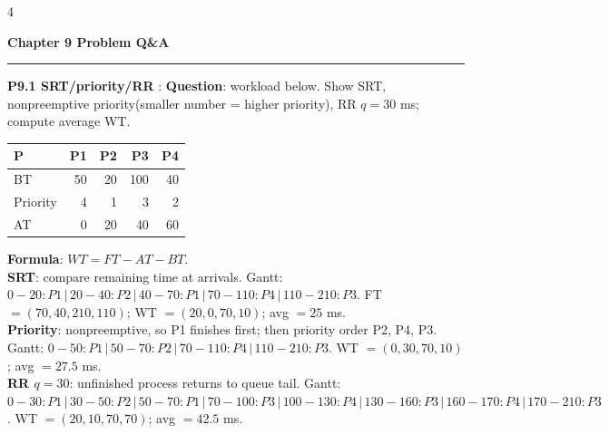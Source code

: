 \documentclass[UTF8,10pt,landscape]{ctexart}
\newcommand{\cheatsectionfont}{\fontsize{9.6pt}{10.1pt}\selectfont}
\newcommand{\cheattinyfont}{\fontsize{7.7pt}{8.2pt}\selectfont}
\newcommand{\cheatsection}[1]{%
  \vspace{3pt}%
  {\color{accent}\normalfont\bfseries\cheatsectionfont #1\par}%
  \vspace{-2.5pt}%
  {\color{accent}\rule{\linewidth}{0.3pt}\par}%
  \vspace{1pt}%
}
\newcommand{\zhhint}[1]{{\color{muted}\cheattinyfont（#1）}}
\newcommand{\term}[2][]{%
  \textbf{\color{accent}#2}%
  \if\relax\detokenize{#1}\relax
  \else\zhhint{#1}%
  \fi
}
\newenvironment{stemlist}{%
  \begingroup
  \cheattinyfont
  \setlength{\parskip}{0.6pt}%
}{%
  \par
  \endgroup
}
\begin{document}
\begin{multicols*}{4}
\cheatsection{Chapter 9 Problem Q\&A}
\begin{stemlist}
\par\noindent\term[甘特图+平均等待]{P9.1 SRT/priority/RR}: \textbf{Question}: workload below. Show SRT, nonpreemptive priority(smaller number = higher priority), RR \(q=30\) ms; compute average WT.
\begin{tabularx}{\linewidth}{@{}lrrrr@{}}
\toprule
P & P1 & P2 & P3 & P4\\
\midrule
BT & 50 & 20 & 100 & 40\\
Priority & 4 & 1 & 3 & 2\\
AT & 0 & 20 & 40 & 60\\
\bottomrule
\end{tabularx}
\textbf{Formula}: \(WT=FT-AT-BT\).\\
\textbf{SRT}: compare remaining time at arrivals. Gantt: \(0\!-\!20:P1\,|\,20\!-\!40:P2\,|\,40\!-\!70:P1\,|\,70\!-\!110:P4\,|\,110\!-\!210:P3\). FT \(=(70,40,210,110)\); WT \(=(20,0,70,10)\); avg \(=25\) ms.\\
\textbf{Priority}: nonpreemptive, so P1 finishes first; then priority order P2, P4, P3. Gantt: \(0\!-\!50:P1\,|\,50\!-\!70:P2\,|\,70\!-\!110:P4\,|\,110\!-\!210:P3\). WT \(=(0,30,70,10)\); avg \(=27.5\) ms.\\
\textbf{RR \(q=30\)}: unfinished process returns to queue tail. Gantt: \(0\!-\!30:P1\,|\,30\!-\!50:P2\,|\,50\!-\!70:P1\,|\,70\!-\!100:P3\,|\,100\!-\!130:P4\,|\,130\!-\!160:P3\,|\,160\!-\!170:P4\,|\,170\!-\!210:P3\). WT \(=(20,10,70,70)\); avg \(=42.5\) ms.


\end{stemlist}
\end{multicols*}
\end{document}
